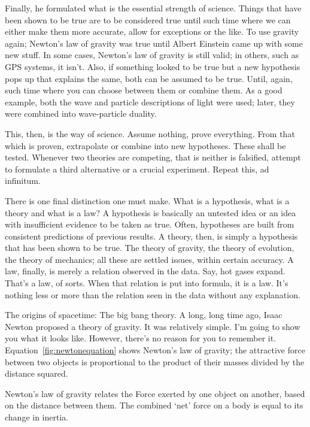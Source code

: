 \begin{multicols}{2}
Finally, he formulated what is the essential strength of science. Things that have been shown to be true are to be considered true until such time where we can either make them more accurate, allow for exceptions or the like. To use gravity again; Newton's law of gravity was true until Albert Einstein came up with some new stuff. In some cases, Newton's law of gravity is still valid; in others, such as GPS systems, it isn't. Also, if something looked to be true but a new hypothesis pops up that explains the same, both can be assumed to be true. Until, again, such time where you can choose between them or combine them. As a good example, both the wave and particle descriptions of light were used; later, they were combined into wave-particle duality.

This, then, is the way of science. Assume nothing, prove everything. From that which is proven, extrapolate or combine into new hypotheses. These shall be tested. Whenever two theories are competing, that is neither is falsified, attempt to formulate a third alternative or a crucial experiment. Repeat this, ad infinitum.

There is one final distinction one must make. What is a hypothesis, what is a theory and what is a law? A hypothesis is basically an untested idea or an idea with insufficient evidence to be taken as true. Often, hypotheses are built from consistent predictions of previous results. A theory, then, is simply a hypothesis that has been shown to be true. The theory of gravity, the theory of evolution, the theory of mechanics; all these are settled issues, within certain accuracy. A law, finally, is merely a relation observed in the data. Say, hot gases expand. That's a law, of sorts. When that relation is put into formula, it is a law. It's nothing less or more than the relation seen in the data without any explanation.

The origins of spacetime: The big bang theory.
A long, long time ago, Isaac Newton proposed a theory of gravity. It was relatively simple. I'm going to show you what it looks like. However, there's no reason for you to remember it. Equation~\ref{fig:newtonequation} shows Newton's law of gravity; the attractive force between two objects is proportional to the product of their masses divided by the distance squared.


Newton's law of gravity relates the Force exerted by one object on another, based on the distance between them. The combined `net' force on a body is equal to its change in inertia. 


\end{multicols}
